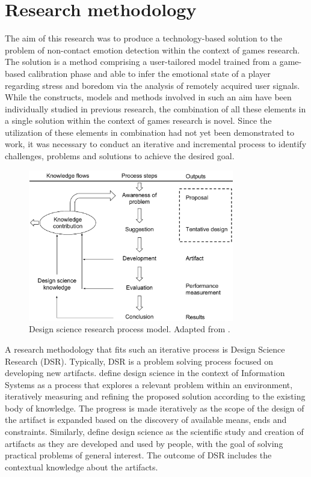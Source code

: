 \chapter{Research methodology}
\label{ch:methodology}

The aim of this research was to produce a technology-based solution to the problem of non-contact emotion detection within the context of games research. The solution is a method comprising a user-tailored model trained from a game-based calibration phase and able to infer the emotional state of a player regarding stress and boredom via the analysis of remotely acquired user signals. While the constructs, models and methods involved in such an aim have been individually studied in previous research, the combination of all these elements in a single solution within the context of games research is novel. Since the utilization of these elements in combination had not yet been demonstrated to work, it was necessary to conduct an iterative and incremental process to identify challenges, problems and solutions to achieve the desired goal.

\begin{figure}[h]
    \centering
    \includegraphics[width=0.8\textwidth]{Content/figures/vaishnavi-design-science-process-model}
    \caption{Design science research process model. Adapted from \textcite{vaishnavi2015design}.}
    \label{fig:vaishnavi-design-science-process-model}
\end{figure}

A research methodology that fits such an iterative process is Design Science Research (DSR). Typically, DSR is a problem solving process focused on developing new artifacts. \textcite{hevner2004design} define design science in the context of Information Systems as a process that explores a relevant problem within an environment, iteratively measuring and refining the proposed solution according to the existing body of knowledge. The progress is made iteratively as the scope of the design of the artifact is expanded based on the discovery of available means, ends and constraints. Similarly, \textcite{johannesson2014introduction} define design science as the scientific study and creation of artifacts as they are developed and used by people, with the goal of solving practical problems of general interest. The outcome of DSR includes the contextual knowledge about the artifacts.

